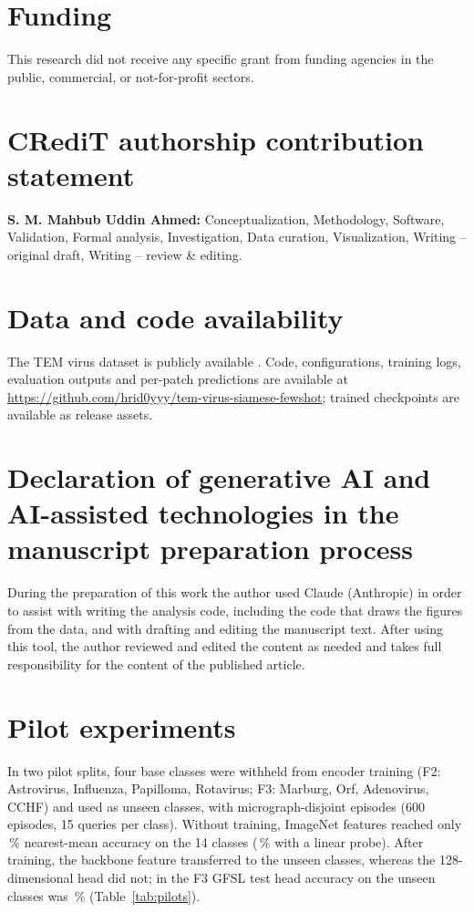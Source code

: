 \documentclass[preprint,review,12pt]{elsarticle}
\begin{document}
\section*{Funding}
This research did not receive any specific grant from funding agencies in the public, commercial, or not-for-profit sectors.

\section*{CRediT authorship contribution statement}
\textbf{S. M. Mahbub Uddin Ahmed:} Conceptualization, Methodology, Software, Validation, Formal analysis, Investigation, Data curation, Visualization, Writing -- original draft, Writing -- review \& editing.

\section*{Data and code availability}
The TEM virus dataset is publicly available \cite{MS21data}. Code, configurations, training logs, evaluation outputs and per-patch predictions are available at \url{https://github.com/hrid0yyy/tem-virus-siamese-fewshot}; trained checkpoints are available as release assets.

\section*{Declaration of generative AI and AI-assisted technologies in the manuscript preparation process}
During the preparation of this work the author used Claude (Anthropic) in order to assist with writing the analysis code, including the code that draws the figures from the data, and with drafting and editing the manuscript text. After using this tool, the author reviewed and edited the content as needed and takes full responsibility for the content of the published article.

\appendix
\renewcommand{\theHfigure}{app.\thefigure}
\renewcommand{\theHtable}{app.\thetable}

\section{Pilot experiments}
\label{app:pilots}
\setcounter{table}{0}\setcounter{figure}{0}

In two pilot splits, four base classes were withheld from encoder training (F2: Astrovirus, Influenza, Papilloma, Rotavirus; F3: Marburg, Orf, Adenovirus, CCHF) and used as unseen classes, with micrograph-disjoint episodes (600 episodes, 15 queries per class). Without training, ImageNet features reached only \PilotFrozenNcm\,\% nearest-mean accuracy on the 14 classes (\PilotFrozenProbe\,\% with a linear probe). After training, the backbone feature transferred to the unseen classes, whereas the 128-dimensional head did not; in the F3 GFSL test head accuracy on the unseen classes was \PilotHeadUnseen\,\% (Table~\ref{tab:pilots}).
\end{document}
